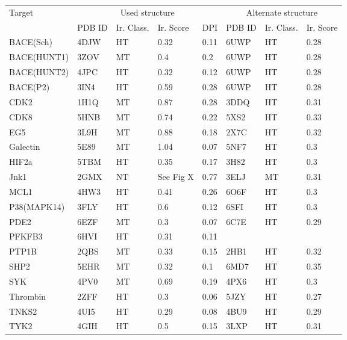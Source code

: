 \begin{tabular}{l|llll|lll}
Target     & \multicolumn{4}{c|}{Used structure}                          & \multicolumn{3}{c}{Alternate structure} \\
           & PDB ID      & Ir. Class. & Ir. Score & DPI  & PDB ID & Ir. Class. &  Ir. Score\\
\hline
BACE(Sch)   & 4DJW        & HT                     & 0.32          & 0.11 & 6UWP& HT& 0.28\\
BACE(HUNT1) & 3ZOV        & MT                     & 0.4           & 0.2  & 6UWP& HT& 0.28\\
BACE(HUNT2) & 4JPC        & HT                     & 0.32          & 0.12 & 6UWP& HT& 0.28\\
BACE(P2)    & 3IN4        & HT                     & 0.59          & 0.28 & 6UWP& HT& 0.28\\
CDK2       & 1H1Q        & MT                     & 0.87          & 0.28 & 3DDQ& HT& 0.31\\
CDK8       & 5HNB        & MT                     & 0.74          & 0.22 & 5XS2& HT& 0.33\\
EG5        & 3L9H        & MT                     & 0.88          & 0.18 & 2X7C& HT& 0.32\\
Galectin   & 5E89        & MT                     & 1.04          & 0.07 & 5NF7& HT& 0.3 \\ 
HIF2a      & 5TBM        & HT                     & 0.35          & 0.17 & 3H82& HT& 0.3 \\ 
Jnk1       & 2GMX        & NT                     & See Fig X     & 0.77 & 3ELJ& MT& 0.31\\
MCL1       & 4HW3        & HT                     & 0.41          & 0.26 & 6O6F& HT& 0.3 \\
P38(MAPK14)& 3FLY        & HT                     & 0.6           & 0.12 & 6SFI& HT& 0.3 \\
PDE2       & 6EZF        & MT                     & 0.3           & 0.07 & 6C7E& HT& 0.29\\
PFKFB3     & 6HVI        & HT                     & 0.31          & 0.11 & & & \\
PTP1B      & 2QBS        & MT                     & 0.33          & 0.15 & 2HB1& HT& 0.32\\
SHP2       & 5EHR        & MT                     & 0.32          & 0.1  & 6MD7& HT& 0.35\\
SYK        & 4PV0        & MT                     & 0.69          & 0.19 & 4PX6& HT& 0.3\\
Thrombin   & 2ZFF        & HT                     & 0.3           & 0.06 & 5JZY& HT& 0.27\\
TNKS2      & 4UI5        & HT                     & 0.29          & 0.08 & 4BU9& HT& 0.29\\
TYK2       & 4GIH        & HT                     & 0.5           & 0.15 & 3LXP& HT& 0.31\\
\end{tabular}